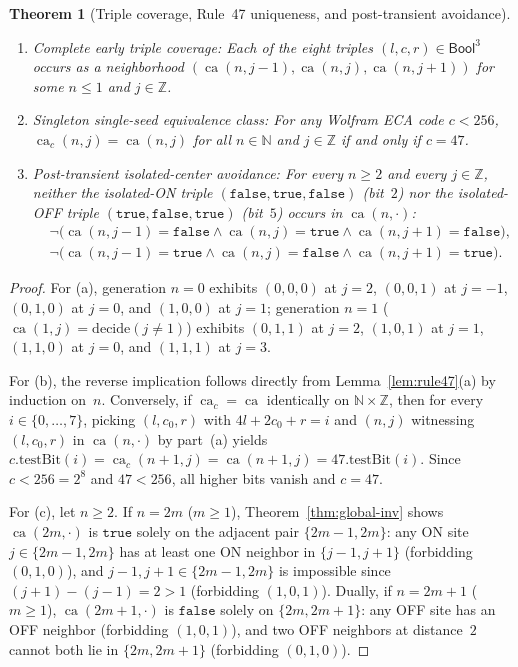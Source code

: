 \documentclass[11pt]{article}
\newtheorem{theorem}{Theorem}[section]
\theoremstyle{definition}
\newcommand{\N}{\mathbb{N}}
\newcommand{\Z}{\mathbb{Z}}
\newcommand{\ca}{\operatorname{ca}}
\begin{document}
\begin{theorem}[Triple coverage, Rule~47 uniqueness, and post-transient avoidance]
\label{thm:uniqueness}
\mbox{}
\begin{enumerate}
\item[\textup{(a)}] \emph{Complete early triple coverage:} Each of the eight triples $(l, c, r) \in \mathsf{Bool}^3$ occurs as a neighborhood $(\ca(n, j - 1),\allowbreak \ca(n, j),\allowbreak \ca(n, j + 1))$ for some $n \le 1$ and $j \in \Z$.
\item[\textup{(b)}] \emph{Singleton single-seed equivalence class:} For any Wolfram ECA code $c < 256$, $\ca_c(n, j) = \ca(n, j)$ for all $n \in \N$ and $j \in \Z$ if and only if $c = 47$.
\item[\textup{(c)}] \emph{Post-transient isolated-center avoidance:} For every $n \ge 2$ and every $j \in \Z$, neither the isolated-ON triple $(\mathtt{false}, \mathtt{true}, \mathtt{false})$ (bit~$2$) nor the isolated-OFF triple $(\mathtt{true}, \mathtt{false}, \mathtt{true})$ (bit~$5$) occurs in $\ca(n, \cdot)$:
\begin{align*}
&\neg\bigl(\ca(n, j - 1) = \mathtt{false} \land \ca(n, j) = \mathtt{true} \land \ca(n, j + 1) = \mathtt{false}\bigr),\\
&\neg\bigl(\ca(n, j - 1) = \mathtt{true} \land \ca(n, j) = \mathtt{false} \land \ca(n, j + 1) = \mathtt{true}\bigr).
\end{align*}
\end{enumerate}
\end{theorem}

\begin{proof}
For (a), generation $n = 0$ exhibits $(0, 0, 0)$ at $j = 2$, $(0, 0, 1)$ at $j = -1$, $(0, 1, 0)$ at $j = 0$, and $(1, 0, 0)$ at $j = 1$; generation $n = 1$ ($\ca(1, j) = \mathrm{decide}(j \ne 1)$) exhibits $(0, 1, 1)$ at $j = 2$, $(1, 0, 1)$ at $j = 1$, $(1, 1, 0)$ at $j = 0$, and $(1, 1, 1)$ at $j = 3$.

For (b), the reverse implication follows directly from Lemma~\ref{lem:rule47}(a) by induction on~$n$. Conversely, if $\ca_c = \ca$ identically on $\N \times \Z$, then for every $i \in \{0, \dots, 7\}$, picking $(l, c_0, r)$ with $4l + 2c_0 + r = i$ and $(n, j)$ witnessing $(l, c_0, r)$ in $\ca(n, \cdot)$ by part~(a) yields $c.\mathrm{testBit}(i) = \ca_c(n + 1, j) = \ca(n + 1, j) = 47.\mathrm{testBit}(i)$. Since $c < 256 = 2^8$ and $47 < 256$, all higher bits vanish and $c = 47$.

For (c), let $n \ge 2$. If $n = 2m$ ($m \ge 1$), Theorem~\ref{thm:global-inv} shows $\ca(2m, \cdot)$ is $\mathtt{true}$ solely on the adjacent pair $\{2m - 1, 2m\}$: any ON site $j \in \{2m - 1, 2m\}$ has at least one ON neighbor in $\{j - 1, j + 1\}$ (forbidding $(0, 1, 0)$), and $j - 1, j + 1 \in \{2m - 1, 2m\}$ is impossible since $(j + 1) - (j - 1) = 2 > 1$ (forbidding $(1, 0, 1)$). Dually, if $n = 2m + 1$ ($m \ge 1$), $\ca(2m + 1, \cdot)$ is $\mathtt{false}$ solely on $\{2m, 2m + 1\}$: any OFF site has an OFF neighbor (forbidding $(1, 0, 1)$), and two OFF neighbors at distance~$2$ cannot both lie in $\{2m, 2m + 1\}$ (forbidding $(0, 1, 0)$).
\end{proof}
\end{document}
